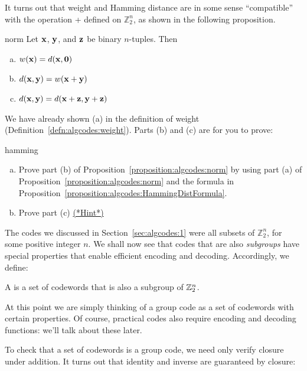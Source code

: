 It turns out that  weight and Hamming distance are in some sense ``compatible'' with the operation + defined on $\mathbb{Z}_2^n$, as shown in the following proposition.

\begin{prop}{norm}
Let ${\bold x}$, ${\bold y}$, and ${\bold z}$ be binary $n$-tuples. Then
\begin{enumerate}[(a)]
\item
$w({\bold x}) = d({\bold x},{\bold 0})$
\item
$d({\bold x},{\bold y}) = w({\bold x}+{\bold y})$
\item
$d({\bold x},{\bold y}) = d({\bold x}+{\bold z},{\bold y}+{\bold z})$
\end{enumerate}
\end{prop}
We have already shown (a) in the definition of weight (Definition~\ref{defn:algcodes:weight}).
Parts (b) and (c) are for you to prove:

\begin{exercise}{hamming}
\begin{enumerate}[(a)]
\item
Prove part (b) of Proposition~\ref{proposition:algcodes:norm} by using part (a) of Proposition~\ref{proposition:algcodes:norm} and the formula in Proposition~\ref{proposition:algcodes:HammingDistFormula}.
\item Prove part (c) \hyperref[sec:algcodes:hints]{(*Hint*)} 
\end{enumerate}
\end{exercise}
The codes we discussed in Section~\ref{sec:algcodes:1} were all subsets of $\mathbb{Z}_2^n$, for some positive integer $n$. We shall now see that codes that are also \emph{subgroups} have special properties that enable efficient encoding and decoding. Accordingly, we define:

\begin{defn}
 A  is a set of codewords that is also a subgroup of ${\Bbb
Z}_2^n$.  
 \end{defn}

\begin{rem} At this point we are simply thinking of a group code as a set of codewords with certain properties. Of course, practical codes also require  encoding and decoding functions: we'll talk about these later.
\end{rem} 

 To check that a set of codewords is a group code, we need only verify closure under addition. It turns out that identity and inverse are guaranteed by closure:

